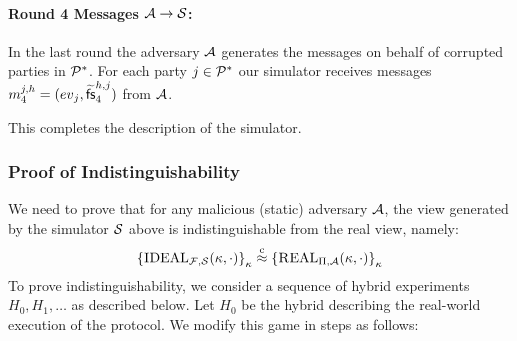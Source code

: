 \paragraph{Round 4 Messages ${\cal A} \rightarrow {\cal S}$:} In the last round the adversary ${\cal A}$ generates the messages on behalf of corrupted parties in ${\cal P}^*$. For each party $j\in{\cal P}^*$ our simulator receives messages ${m}^{j,h}_4=({ev}_j, {\widetilde{\mathsf{fs}}}^{h,j}_4)$ from ${\cal A}$.

This completes the description of the simulator.







\subsubsection{Proof of Indistinguishability}
We need to prove that for any malicious (static) adversary ${\cal A}$, the view generated by the simulator ${\cal S}$ above is indistinguishable from the real view, namely:
$$
\left\{\mbox{\textsc IDEAL}_{\mathbf{\mathcal{F}},{\cal S}}(\kappa,\cdot)\right\}_{\kappa} \stackrel{\rm c}{\approx}
\left\{\mbox{\textsc REAL}_{\Pi,{\cal A}}(\kappa,\cdot)\right\}_{\kappa}
$$
To prove indistinguishability, we consider a sequence of hybrid experiments $H_0,H_1,\ldots$ as described below. Let $H_0$ be the hybrid describing the real-world execution of the protocol. We modify this game in steps as follows:

